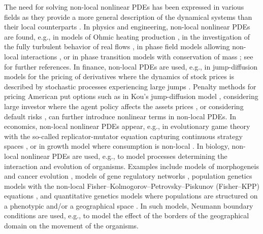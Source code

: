 The need for solving non-local nonlinear PDEs has been expressed in various fields as they provide a more general description of the dynamical systems than their local counterparts \cite{Kavallaris2018,Sunderasan2020}.
%
In physics and engineering, non-local nonlinear PDEs are found, e.g., in models of Ohmic heating production \cite{Lacey1995}, in the investigation of the fully turbulent behavior of real flows \cite{Caglioti1992}, in phase field models allowing non-local interactions \cite{Barone1971,Gajewski2003,Coleman1994,Hairer2016}, or in phase transition models with conservation of mass \cite{RUBINSTEIN1992,Stoleriu2011}; see \cite{Kavallaris2018} for further references.
%
In finance, non-local PDEs are used, e.g., in jump-diffusion models for the pricing of derivatives where the dynamics of stock prices is described by stochastic processes experiencing large jumps \cite{Merton1976,Chan1999,Kou2000,Abergel2010,Benth2001,Sunderasan2020,Cruz2020,Tankov2003}. Penalty methods for pricing American put options such as in Kou's jump-diffusion model \cite{Huang2013,Gan2020}, considering large investor where the agent policy affects the assets prices \cite{Amadori2003,Abergel2010}, or considering default risks \cite{Pham2009,Henry-Labordere2012}, can further introduce nonlinear terms in non-local PDEs.
%
In economics, non-local nonlinear PDEs appear, e.g., in evolutionary game theory with the so-called replicator-mutator equation capturing continuous strategy spaces \cite{Oechssler2001,Kavallaris2017,Hamel2020,Alfaro2016,Alfaro2019}, or in growth model where consumption is non-local \cite{Banerjee2021}.
%
In biology, non-local nonlinear PDEs are used, e.g., to model processes determining the interaction and evolution of organisms. Examples include models of morphogeneis and cancer evolution \cite{Lorz2013,Chen2020,Villa2021}, models of gene regulatory networks \cite{Pajaro2017}, population genetics models with the non-local Fisher--Kolmogorov--Petrovsky--Piskunov (Fisher--KPP) equations \cite{FISHER1937,Hamel2001,Bian2017,Perthame2007,Berestycki2009b,Houchmandzadeh2017,Wang2021}, and quantitative genetics models where populations are structured on a phenotypic and/or a geographical space \cite{Burger1994,Genieys2006a,Berestycki2016,Nordbotten2016,Nordbotten2018,Roques2016,Doebeli2010,Nordbotten2020}. In such models, Neumann boundary conditions are used, e.g., to model the effect of the borders of the geographical domain on the movement of the organisms.

